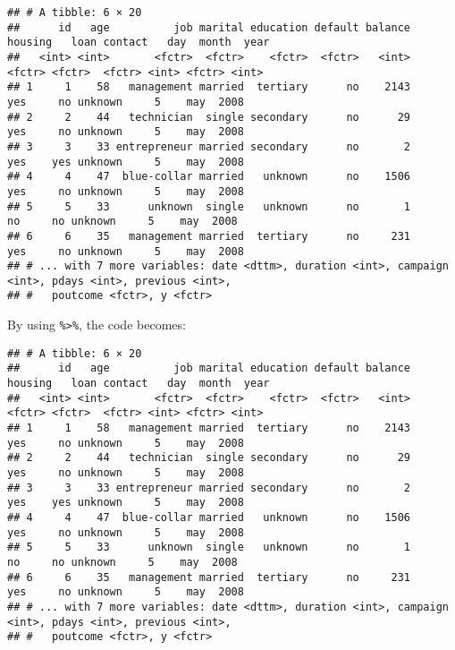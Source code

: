 \documentclass[]{book}
\newenvironment{Shaded}{\begin{snugshade}}{\end{snugshade}}
\newcommand{\KeywordTok}[1]{\textcolor[rgb]{0.13,0.29,0.53}{\textbf{{#1}}}}
\newcommand{\StringTok}[1]{\textcolor[rgb]{0.31,0.60,0.02}{{#1}}}
\newcommand{\NormalTok}[1]{{#1}}
\begin{document}
\begin{verbatim}
## # A tibble: 6 × 20
##      id   age          job marital education default balance housing   loan contact   day  month  year
##   <int> <int>       <fctr>  <fctr>    <fctr>  <fctr>   <int>  <fctr> <fctr>  <fctr> <int> <fctr> <int>
## 1     1    58   management married  tertiary      no    2143     yes     no unknown     5    may  2008
## 2     2    44   technician  single secondary      no      29     yes     no unknown     5    may  2008
## 3     3    33 entrepreneur married secondary      no       2     yes    yes unknown     5    may  2008
## 4     4    47  blue-collar married   unknown      no    1506     yes     no unknown     5    may  2008
## 5     5    33      unknown  single   unknown      no       1      no     no unknown     5    may  2008
## 6     6    35   management married  tertiary      no     231     yes     no unknown     5    may  2008
## # ... with 7 more variables: date <dttm>, duration <int>, campaign <int>, pdays <int>, previous <int>,
## #   poutcome <fctr>, y <fctr>
\end{verbatim}

By using \texttt{\%\textgreater{}\%}, the code becomes:

\begin{Shaded}
\end{Shaded}

\begin{verbatim}
## # A tibble: 6 × 20
##      id   age          job marital education default balance housing   loan contact   day  month  year
##   <int> <int>       <fctr>  <fctr>    <fctr>  <fctr>   <int>  <fctr> <fctr>  <fctr> <int> <fctr> <int>
## 1     1    58   management married  tertiary      no    2143     yes     no unknown     5    may  2008
## 2     2    44   technician  single secondary      no      29     yes     no unknown     5    may  2008
## 3     3    33 entrepreneur married secondary      no       2     yes    yes unknown     5    may  2008
## 4     4    47  blue-collar married   unknown      no    1506     yes     no unknown     5    may  2008
## 5     5    33      unknown  single   unknown      no       1      no     no unknown     5    may  2008
## 6     6    35   management married  tertiary      no     231     yes     no unknown     5    may  2008
## # ... with 7 more variables: date <dttm>, duration <int>, campaign <int>, pdays <int>, previous <int>,
## #   poutcome <fctr>, y <fctr>
\end{verbatim}
\end{document}
